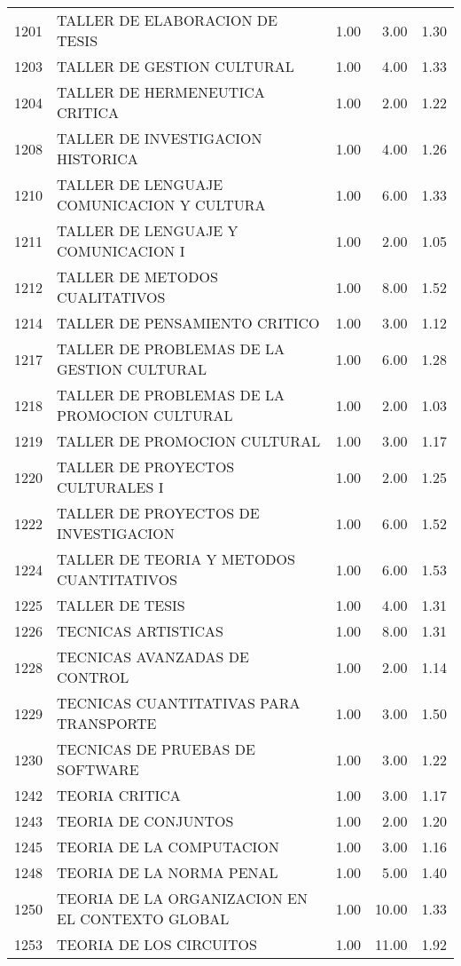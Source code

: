 \begin{table}[ht]
\begin{tabular}{rlrrr}
  1201 & TALLER DE ELABORACION DE TESIS & 1.00 & 3.00 & 1.30 \\ 
  1203 & TALLER DE GESTION CULTURAL & 1.00 & 4.00 & 1.33 \\ 
  1204 & TALLER DE HERMENEUTICA CRITICA & 1.00 & 2.00 & 1.22 \\ 
  1208 & TALLER DE INVESTIGACION HISTORICA & 1.00 & 4.00 & 1.26 \\ 
  1210 & TALLER DE LENGUAJE COMUNICACION Y CULTURA & 1.00 & 6.00 & 1.33 \\ 
  1211 & TALLER DE LENGUAJE Y COMUNICACION I & 1.00 & 2.00 & 1.05 \\ 
  1212 & TALLER DE METODOS CUALITATIVOS & 1.00 & 8.00 & 1.52 \\ 
  1214 & TALLER DE PENSAMIENTO CRITICO & 1.00 & 3.00 & 1.12 \\ 
  1217 & TALLER DE PROBLEMAS DE LA GESTION CULTURAL & 1.00 & 6.00 & 1.28 \\ 
  1218 & TALLER DE PROBLEMAS DE LA PROMOCION CULTURAL & 1.00 & 2.00 & 1.03 \\ 
  1219 & TALLER DE PROMOCION CULTURAL & 1.00 & 3.00 & 1.17 \\ 
  1220 & TALLER DE PROYECTOS CULTURALES I & 1.00 & 2.00 & 1.25 \\ 
  1222 & TALLER DE PROYECTOS DE INVESTIGACION & 1.00 & 6.00 & 1.52 \\ 
  1224 & TALLER DE TEORIA Y METODOS CUANTITATIVOS & 1.00 & 6.00 & 1.53 \\ 
  1225 & TALLER DE TESIS & 1.00 & 4.00 & 1.31 \\ 
  1226 & TECNICAS ARTISTICAS & 1.00 & 8.00 & 1.31 \\ 
  1228 & TECNICAS AVANZADAS DE CONTROL & 1.00 & 2.00 & 1.14 \\ 
  1229 & TECNICAS CUANTITATIVAS PARA TRANSPORTE & 1.00 & 3.00 & 1.50 \\ 
  1230 & TECNICAS DE PRUEBAS DE SOFTWARE & 1.00 & 3.00 & 1.22 \\ 
  1242 & TEORIA CRITICA & 1.00 & 3.00 & 1.17 \\ 
  1243 & TEORIA DE CONJUNTOS & 1.00 & 2.00 & 1.20 \\ 
  1245 & TEORIA DE LA COMPUTACION & 1.00 & 3.00 & 1.16 \\ 
  1248 & TEORIA DE LA NORMA PENAL & 1.00 & 5.00 & 1.40 \\ 
  1250 & TEORIA DE LA ORGANIZACION EN EL CONTEXTO GLOBAL & 1.00 & 10.00 & 1.33 \\ 
  1253 & TEORIA DE LOS CIRCUITOS & 1.00 & 11.00 & 1.92 \\ 

\end{tabular}
\end{table}
